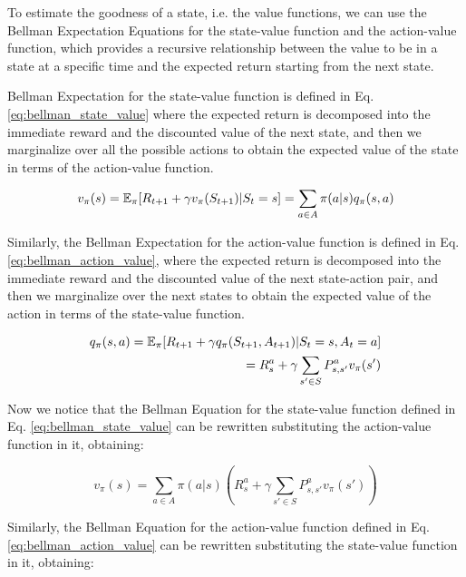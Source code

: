 To estimate the goodness of a state, i.e. the value functions, we can use the Bellman Expectation Equations for the state-value function and the action-value function, which provides a recursive relationship between the value to be in a state at a specific time and the expected return starting from the next state.

Bellman Expectation for the state-value function is defined in Eq. \ref{eq:bellman_state_value} where the expected return is decomposed into the immediate reward and the discounted value of the next state, and then we marginalize over all the possible actions to obtain the expected value of the state in terms of the action-value function.

\begin{equation} \label{eq:bellman_state_value}
    v_{\pi}(s) = \operatorname{\mathbb{E}}_{\pi}[R_{t+1} + \gamma v_{\pi}(S_{t+1}) | S_t = s] = \sum_{a \in A} \pi(a|s)q_{\pi}(s, a)
\end{equation}

Similarly, the Bellman Expectation for the action-value function is defined in Eq. \ref{eq:bellman_action_value}, where the expected return is decomposed into the immediate reward and the discounted value of the next state-action pair, and then we marginalize over the next states to obtain the expected value of the action in terms of the state-value function.

\begin{equation} \label{eq:bellman_action_value}
\begin{split}
    q_{\pi}(s, a) = \operatorname{\mathbb{E}}_{\pi}[R_{t+1} + \gamma q_{\pi}(S_{t+1}, A_{t+1}) | S_t = s, A_t = a] \\
    = R_s^a + \gamma \sum_{s' \in S} P_{s, s'}^a v_{\pi}(s')
    \end{split}
\end{equation}

Now we notice that the Bellman Equation for the state-value function defined in Eq. \ref{eq:bellman_state_value} can be rewritten substituting the action-value function in it, obtaining:

\begin{equation}
    v_{\pi}(s) = \sum_{a \in A} \pi(a|s)(R_s^a + \gamma \sum_{s' \in S} P_{s, s'}^a v_{\pi}(s'))
\end{equation}

Similarly, the Bellman Equation for the action-value function defined in Eq. \ref{eq:bellman_action_value} can be rewritten substituting the state-value function in it, obtaining:

